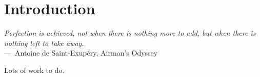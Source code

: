 
\chapter{Introduction}
\label{ch:Introduction}

\begin{epigraph}
	\emph{Perfection is achieved, not when there is nothing more to add, but when there is nothing left to take away.}\\
	---~Antoine de Saint-Exupéry, Airman's Odyssey
\end{epigraph}

Lots of work to do.

\endinput
